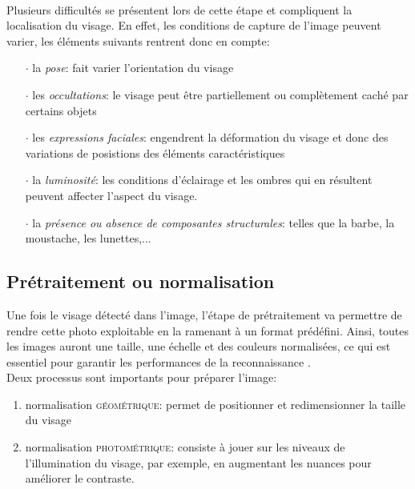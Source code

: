 \paragraph{}
Plusieurs difficultés se présentent lors de cette étape et compliquent la localisation du visage. En effet, les conditions de capture de l'image peuvent varier, les éléments suivants rentrent donc en compte:
\begin{itemize}
\item[$\cdot$]la \textit{pose}: fait varier l'orientation du visage
\item[$\cdot$]les \textit{occultations}: le visage peut être partiellement ou complètement caché par certains objets
\item[$\cdot$]les \textit{expressions faciales}: engendrent la déformation du visage et donc des variations de posistions des éléments caractéristiques
\item[$\cdot$]la \textit{luminosité}: les conditions d'éclairage et les ombres qui en résultent peuvent affecter l'aspect du visage.
\item[$\cdot$]la \textit{présence ou absence de composantes structurales}: telles que la barbe, la moustache, les lunettes,...
\end{itemize}

\subsection{Prétraitement ou normalisation}
Une fois le visage détecté dans l'image, l'étape de prétraitement va permettre de rendre cette photo exploitable en la ramenant à un format prédéfini. Ainsi, toutes les images auront une taille, une échelle et des couleurs normalisées, ce qui est essentiel pour garantir les performances de la reconnaissance \cite{Xthesis_1}.
\\
Deux processus sont importants pour préparer l'image:
\begin{enumerate}
\item normalisation \textsc{géométrique}: permet de positionner et redimensionner la taille du visage
\item normalisation \textsc{photométrique}: consiste à jouer sur les niveaux de l'illumination du visage, par exemple, en augmentant les nuances pour améliorer le contraste.
\end{enumerate}


